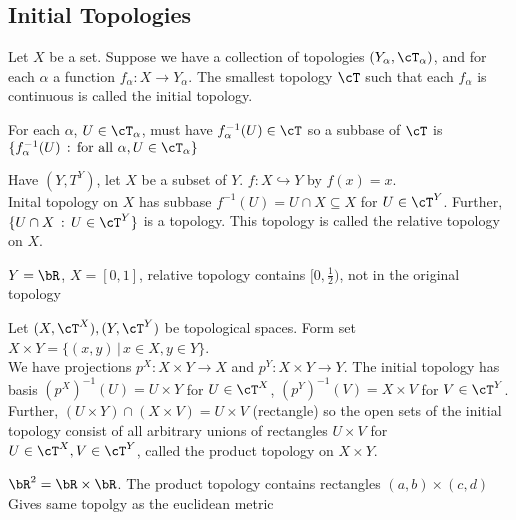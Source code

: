 
\subsection{Initial Topologies}

\begin{definition}
    Let $X$ be a set. Suppose we have a collection of topologies $(Y_{\alpha}, \cT_{\alpha})$, and for each $\alpha$ a function $f_{\alpha}: X \to Y_{\alpha}$. The smallest topology $\cT$ such that each $f_{\alpha}$ is continuous is called the initial topology. 
\end{definition}

\noindent
For each $\alpha$, $U \in \cT_{\alpha}$, must have $f^{-1}_{\alpha}(U) \in \cT$ so a subbase of $\cT$ is $\{f^{-1}_{\alpha}(U) \, : \, \text{for all } \alpha, U \in \cT_{\alpha}\}$ 

\begin{example}
    Have $(Y, T^Y)$, let $X$ be a subset of $Y$. $f: X \hookrightarrow Y$ by $f(x)=x$. \\
    Inital topology on $X$ has subbase $f^{-1}(U) = U \cap X \subseteq X$ for $U \in \cT^Y$. Further, $\{ U \cap X \, : \, U \in \cT^Y \}$ is a topology. This topology is called the relative topology on $X$. 
\end{example}

\begin{example}
    $Y = \bR$, $X = [0,1]$, relative topology contains $[0, \frac{1}{2})$, not in the original topology 
\end{example}

\begin{example}
    Let $(X, \cT^X), (Y, \cT^Y) $ be topological spaces. Form set $X \times Y = \{(x, y) \, |\, x \in X, y \in Y \}$. \\
    We have projections $p^X: X \times Y \to X$ and $p^Y : X \times Y \to Y$. The initial topology has basis $(p^X)^{-1}(U) = U \times Y$ for $U \in \cT^X$, $(p^Y)^{-1}(V) = X \times V$ for $V \in \cT^Y$. \\
    Further, $(U \times Y) \cap (X \times V) = U \times V$ (rectangle) so the open sets of the initial topology consist of all arbitrary unions of rectangles $U \times V$ for $U \in \cT^X, V \in \cT^Y$, called the product topology on $X \times Y$.
\end{example}

\begin{example}
    $\bR^2 = \bR \times \bR$. The product topology contains rectangles $(a,b) \times (c,d)$\\
    Gives same topolgy as the euclidean metric 
\end{example}

